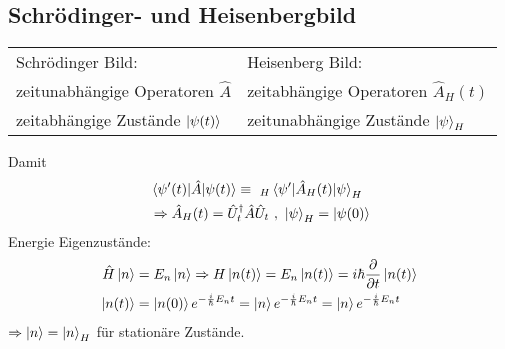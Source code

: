 	\subsection{Schrödinger- und Heisenbergbild}
		\begin{tabular*}{\linewidth}{l l}
			Schrödinger Bild: & Heisenberg Bild: \\ %
			zeitunabhängige Operatoren $\hat{A}$ & zeitabhängige Operatoren $\hat{A}_H(t)$ \\
			zeitabhängige Zustände $\ket{\psi(t)}$ & zeitunabhängige Zustände $\ket{\psi}_H$
		\end{tabular*}
	Damit 
		\begin{align*} %
			&\braket{\psi'(t) | \hat{A} | \psi(t)} \equiv~_H\braket{\psi' | \hat{A}_H(t) | \psi}_H \\
			&\Rightarrow \hat{A}_H(t) = \hat{U}_t^\dagger \hat{A} \hat{U}_t ~,~ \ket{\psi}_H = \ket{\psi(0)}
		\end{align*}	
	Energie Eigenzustände:
		\begin{align*}
			\hat{H} \ket{n} &= E_n \ket{n} \Rightarrow H \ket{n(t)} = E_n \ket{n(t)} = i\hbar \frac{\partial}{\partial t} \ket{n(t)} \\
			\ket{n(t)} &= \ket{n(0)} e^{-\frac{i}{\hbar} E_n t} = \ket{n} e^{- \frac{i}{\hbar} E_n t} = \ket{n} e^{-\frac{i}{\hbar} E_n t} 
		\end{align*}
	$\Rightarrow \ket{n} = \ket{n}_H$ für \grqq stationäre \grqq Zustände.
	
